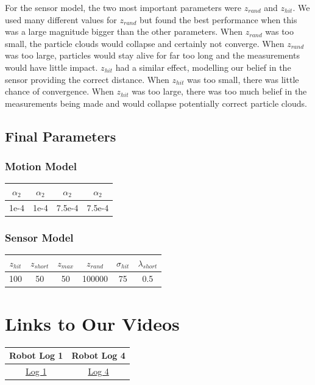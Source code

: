\documentclass[12pt, a4paper]{article}
\begin{document}
\noindent For the sensor model, the two most important parameters were $z_{rand}$ and $z_{hit}$. We used many different values for $z_{rand}$ but found the best performance when this was a large magnitude bigger than the other parameters. When $z_{rand}$ was too small, the particle clouds would collapse and certainly not converge. When $z_{rand}$ was too large, particles would stay alive for far too long and the measurements would have little impact. $z_{hit}$ had a similar effect, modelling our belief in the sensor providing the correct distance. When $z_{hit}$ was too small, there was little chance of convergence. When $z_{hit}$ was too large, there was too much belief in the measurements being made and would collapse potentially correct particle clouds.

\subsection{Final Parameters}
\subsubsection{Motion Model}
\begin{center}
\begin{tabular}{||c |c| c| c||} 
  \hline
  $\alpha_2$ & $\alpha_2$ & $\alpha_2$ & $\alpha_2$ \\
  \hline
  1e-4 & 1e-4 & 7.5e-4 & 7.5e-4 \\
  \hline
\end{tabular}
\end{center}

\subsubsection{Sensor Model}
\begin{center}
\begin{tabular}{||c | c | c | c | c | c||} 
  \hline
  $z_{hit}$ & $z_{short}$ & $z_{max}$ & $z_{rand}$ & $\sigma_{hit}$ & $\lambda_{short}$ \\
  \hline
  100 & 50 & 50 & 100000 & 75 & 0.5 \\
  \hline
\end{tabular}
\end{center}
\section{Links to Our Videos}
\begin{center}
\begin{tabular}{||c | c||} 
  \hline
  Robot Log 1 & Robot Log 4 \\
  \hline
  \href{https://youtu.be/PKaJdCMeA9U}{Log 1} & \href{https://youtu.be/ilJhJMrWBzg}{Log 4} \\
  \hline
\end{tabular}
\end{center}
\end{document}
